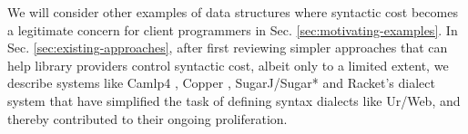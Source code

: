 We will consider other examples of data structures where syntactic cost becomes a legitimate concern for client programmers in Sec. \ref{sec:motivating-examples}. In Sec. \ref{sec:existing-approaches}, after first reviewing simpler approaches that can help library providers control syntactic cost, albeit only to a limited extent, we describe systems like Camlp4 \cite{ocaml-manual}, Copper \cite{conf/gpce/WykS07}, SugarJ/Sugar* \cite{erdweg2011sugarj,erdweg2013framework} and Racket's dialect system \cite{Flatt:2012:CLR:2063176.2063195} that have simplified the task of defining syntax dialects like Ur/Web, and thereby contributed to their ongoing proliferation.






